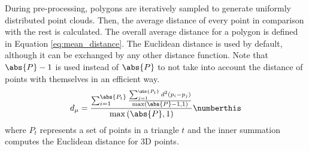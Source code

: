 During pre-processing, polygons are iteratively sampled to generate uniformly distributed point clouds. Then, the average distance of every point in comparison with the rest is calculated. The overall average distance for a polygon is defined in Equation \ref{eq:mean_distance}. The Euclidean distance is used by default, although it can be exchanged by any other distance function. Note that $\abs{P}-1$ is used instead of $\abs{P}$ to not take into account the distance of points with themselves in an efficient way. 
\begin{align*}
    d_{\mu} = \frac{\sum_{i=1}^{\abs{P_t}} \frac{\sum_{j=1}^{\abs{P_t}} d^{2}(p_{i} - p_{j})}{\max\left(\abs{P} - 1, 1\right)}}{\max\left(\abs{P}, 1\right)}
    \numberthis \label{eq:mean_distance}
\end{align*}
where $P_t$ represents a set of points in a triangle $t$ and the inner summation computes the Euclidean distance for 3D points.

